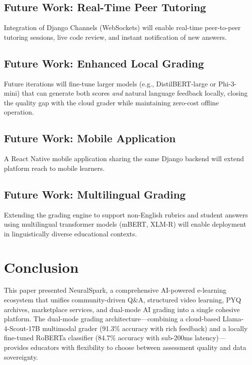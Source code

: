 \documentclass[conference]{IEEEtran}
\begin{document}
\subsection{Future Work: Real-Time Peer Tutoring}
Integration of Django Channels (WebSockets) will enable real-time peer-to-peer tutoring sessions, live code review, and instant notification of new answers.

\subsection{Future Work: Enhanced Local Grading}
Future iterations will fine-tune larger models (e.g., DistilBERT-large or Phi-3-mini) that can generate both scores \textit{and} natural language feedback locally, closing the quality gap with the cloud grader while maintaining zero-cost offline operation.

\subsection{Future Work: Mobile Application}
A React Native mobile application sharing the same Django backend will extend platform reach to mobile learners.

\subsection{Future Work: Multilingual Grading}
Extending the grading engine to support non-English rubrics and student answers using multilingual transformer models (mBERT, XLM-R) will enable deployment in linguistically diverse educational contexts.

\section{Conclusion}
This paper presented NeuralSpark, a comprehensive AI-powered e-learning ecosystem that unifies community-driven Q\&A, structured video learning, PYQ archives, marketplace services, and dual-mode AI grading into a single cohesive platform. The dual-mode grading architecture---combining a cloud-based Llama-4-Scout-17B multimodal grader (91.3\% accuracy with rich feedback) and a locally fine-tuned RoBERTa classifier (84.7\% accuracy with sub-200ms latency)---provides educators with flexibility to choose between assessment quality and data sovereignty.
\end{document}
